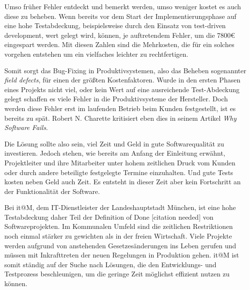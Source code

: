 \documentclass[12pt,a4paper,bibliography=totocnumbered,listof=totocnumbered]{scrartcl}
\begin{document}

Umso früher Fehler entdeckt und bemerkt werden, umso weniger kostet es auch diese zu beheben. Wenn bereits vor dem Start der Implementierungsphase auf eine hohe Testabdeckung, beispielsweise durch den Einsatz von test-driven development, wert gelegt wird, können, je auftretendem Fehler, um die 7800\euro\ \cite{sqsdefect} eingespart werden. Mit diesen Zahlen sind die Mehrkosten, die für ein solches vorgehen entstehen um ein vielfaches leichter zu rechtfertigen.

Somit sorgt das Bug-Fixing in Produktivsystemen, also das Beheben sogenannter \textit{field defects}, für einen der größten Kostenfaktoren. Wurde in den ersten Phasen eines Projekts nicht viel, oder kein Wert auf eine ausreichende Test-Abdeckung gelegt schaffen es viele Fehler in die Produktivsysteme der Hersteller. Doch werden diese Fehler erst im laufenden Betrieb beim Kunden festgestellt, ist es bereits zu spät. Robert N. Charette kritisiert eben dies in seinem Artikel \textit{Why Software Fails}\cite{charette}.


Die Lösung sollte also sein, viel Zeit und Geld in gute Softwarequalität zu investieren. Jedoch stehen, wie bereits am Anfang der Einleitung erwähnt, Projektleiter und ihre Mitarbeiter unter hohem zeitlichen Druck vom Kunden oder durch andere beteiligte festgelegte Termine einzuhalten. Und gute Tests kosten neben Geld auch Zeit. Es entsteht in dieser Zeit aber kein Fortschritt an der Funktionalität der Software.

Bei it@M, dem IT-Dienstleister der Landeshauptstadt München, ist eine hohe Testabdeckung daher Teil der Definition of Done [citation needed] von Softwareprojekten. Im Kommunalen Umfeld sind die zeitlichen Restriktionen noch einmal stärker zu gewichten als in der freien Wirtschaft. Viele Projekte werden aufgrund von anstehenden Gesetzesänderungen ins Leben gerufen und müssen mit Inkrafttreten der neuen Regelungen in Produktion gehen. it@M ist somit ständig auf der Suche nach Lösungen, die den Entwicklungs- und Testprozess beschleunigen, um die geringe Zeit möglichst effizient nutzen zu können.
\end{document}
